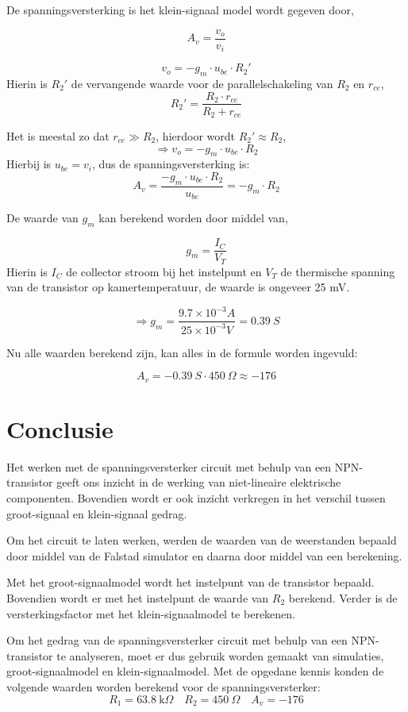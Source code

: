 \documentclass{report}
\begin{document}
De spanningsversterking is het klein-signaal model wordt gegeven door,

\begin{equation}
A_v=\frac{v_o}{v_i}
\end{equation}

\begin{equation}
v_o=-g_m\cdot u_{be}\cdot R_2'
\end{equation}
Hierin is $R_2'$ de vervangende waarde voor de parallelschakeling van $R_2$ en $r_{ce}$,
$$R_2'=\frac{R_2\cdot r_{ce}}{R_2+r_{ce}}$$

\noindent Het is meestal zo dat $r_{ce}\gg R_2$, hierdoor wordt $R_2'\approx R_2$,
$$\Rightarrow v_o=-g_m\cdot u_{be}\cdot R_2$$
Hierbij is $u_{be}=v_i$, dus de spanningsversterking is:
$$A_v=\frac{-g_m\cdot u_{be}\cdot R_2}{u_{be}}=-g_m\cdot R_2$$

\noindent De waarde van $g_m$ kan berekend worden door middel van,

\begin{equation}
g_m=\frac{I_C}{V_T}
\end{equation}
Hierin is $I_C$ de collector stroom bij het instelpunt en $V_T$ de thermische spanning van de transistor op kamertemperatuur, de waarde is ongeveer 25 mV.

$$\Rightarrow g_m=\frac{9.7\times 10^{-3}A}{25\times 10^{-3}V}= 0.39 \: S$$

\noindent Nu alle waarden berekend zijn, kan alles in de formule worden ingevuld:

$$A_v= -0.39 \: S\cdot 450 \: \Omega\approx -176 $$

\chapter{Conclusie}
Het werken met de spanningsversterker circuit met behulp van een NPN-transistor geeft ons inzicht in de werking van niet-lineaire elektrische componenten. Bovendien wordt er ook inzicht verkregen in het verschil tussen groot-signaal en klein-signaal gedrag.

Om het circuit te laten werken, werden de waarden van de weerstanden bepaald door middel van de Falstad simulator en daarna door middel van een berekening.

Met het groot-signaalmodel wordt het instelpunt van de transistor bepaald. Bovendien wordt er met het instelpunt de waarde van $R_2$ berekend. Verder is de versterkingsfactor met het klein-signaalmodel te berekenen. 

Om het gedrag van de spanningsversterker circuit met behulp van een NPN-transistor te analyseren, moet er dus gebruik worden gemaakt van simulaties, groot-signaalmodel en klein-signaalmodel.
Met de opgedane kennis konden de volgende waarden worden berekend voor de spanningsversterker:
$$R_{1} = 63.8 \: \mathrm{k}\Omega \quad R_{2} = 450\: \Omega \quad A_{v} = -176$$

\newpage
\printbibliography
\end{document}
